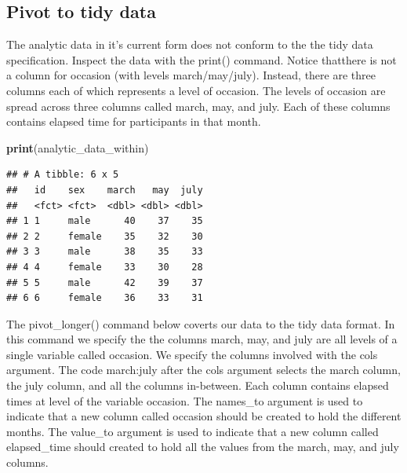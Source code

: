 \documentclass[
]{krantz}
\makeatletter
\newenvironment{Shaded}{\begin{snugshade}}{\end{snugshade}}
\newcommand{\DataTypeTok}[1]{\textcolor[rgb]{0.27,0.27,0.27}{#1}}
\newcommand{\KeywordTok}[1]{\textcolor[rgb]{0.27,0.27,0.27}{\textbf{#1}}}
\newcommand{\NormalTok}[1]{#1}
\newcommand{\OperatorTok}[1]{\textcolor[rgb]{0.43,0.43,0.43}{\textbf{#1}}}
\newcommand{\StringTok}[1]{\textcolor[rgb]{0.5,0.5,0.5}{#1}}
\newenvironment{kframe}{%
\medskip{}
\setlength{\fboxsep}{.8em}
 \def\at@end@of@kframe{}%
 \ifinner\ifhmode%
  \def\at@end@of@kframe{\end{minipage}}%
  \begin{minipage}{\columnwidth}%
 \fi\fi%
 \def\FrameCommand##1{\hskip\@totalleftmargin \hskip-\fboxsep
 \colorbox{shadecolor}{##1}\hskip-\fboxsep
     \hskip-\linewidth \hskip-\@totalleftmargin \hskip\columnwidth}%
 \MakeFramed {\advance\hsize-\width
   \@totalleftmargin\z@ \linewidth\hsize
   \@setminipage}}%
 {\par\unskip\endMakeFramed%
 \at@end@of@kframe}
\renewenvironment{Shaded}{\begin{kframe}}{\end{kframe}}
\makeatother
\begin{document}
\hypertarget{pivot-to-tidy-data}{%
\subsection{Pivot to tidy data}\label{pivot-to-tidy-data}}

The analytic data in it's current form does not conform to the the tidy data specification. Inspect the data with the print() command. Notice thatthere is not a column for occasion (with levels march/may/july). Instead, there are three columns each of which represents a level of occasion. The levels of occasion are spread across three columns called march, may, and july. Each of these columns contains elapsed time for participants in that month.

\begin{Shaded}
\begin{Highlighting}[]
\KeywordTok{print}\NormalTok{(analytic_data_within)}
\end{Highlighting}
\end{Shaded}

\begin{verbatim}
## # A tibble: 6 x 5
##   id    sex    march   may  july
##   <fct> <fct>  <dbl> <dbl> <dbl>
## 1 1     male      40    37    35
## 2 2     female    35    32    30
## 3 3     male      38    35    33
## 4 4     female    33    30    28
## 5 5     male      42    39    37
## 6 6     female    36    33    31
\end{verbatim}

The pivot\_longer() command below coverts our data to the tidy data format. In this command we specify the the columns march, may, and july are all levels of a single variable called occasion. We specify the columns involved with the cols argument. The code march:july after the cols argument selects the march column, the july column, and all the columns in-between. Each column contains elapsed times at level of the variable occasion. The names\_to argument is used to indicate that a new column called occasion should be created to hold the different months. The value\_to argument is used to indicate that a new column called elapsed\_time should created to hold all the values from the march, may, and july columns.

\begin{Shaded}
\end{Shaded}
\end{document}
